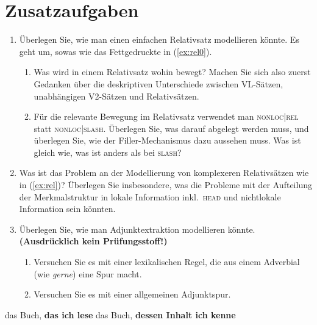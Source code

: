 \documentclass[10pt,a3paper]{article}
\newcommand{\Sub}[1]{\ensuremath{_{\text{#1}}}}
\newcommand{\Zeile}{\vspace{\baselineskip}}
\newcommand{\Halbzeile}{\vspace{0.5\baselineskip}}
\begin{document}

\newpage

\section{Zusatzaufgaben}

\begin{enumerate}
  \item Überlegen Sie, wie man einen einfachen Relativsatz modellieren könnte.
    Es geht um, sowas wie das Fettgedruckte in (\ref{ex:rel0}).
    \begin{enumerate}
      \item Was wird in einem Relativsatz wohin bewegt?
        Machen Sie sich also zuerst Gedanken über die deskriptiven Unterschiede zwischen VL-Sätzen, unabhängigen V2-Sätzen und Relativsätzen.
      \item Für die relevante Bewegung im Relativsatz verwendet man \textsc{nonloc|rel} statt \textsc{nonloc|slash}.
        Überlegen Sie, was darauf abgelegt werden muss, und überlegen Sie, wie der Filler-Mechanismus dazu aussehen muss.
        Was ist gleich wie, was ist anders als bei \textsc{slash}?
    \end{enumerate}
    \Halbzeile
  \item Was ist das Problem an der Modellierung von komplexeren Relativsätzen wie in (\ref{ex:rel})?
    Überlegen Sie insbesondere, was die Probleme mit der Aufteilung der Merkmalstruktur in lokale Information inkl.\ \textsc{head} und nichtlokale Information sein könnten.
    \Halbzeile
  \item Überlegen Sie, wie man Adjunktextraktion modellieren könnte. \textbf{(Ausdrücklich kein Prüfungsstoff!)}
    \begin{enumerate}
      \item Versuchen Sie es mit einer lexikalischen Regel, die aus einem Adverbial (wie \textit{gerne}) eine Spur macht.
      \item Versuchen Sie es mit einer allgemeinen Adjunktspur.
    \end{enumerate}
\end{enumerate}

\Zeile

\begin{exe}
  \ex\label{ex:rel0} das Buch, \textbf{das ich lese}
  \ex\label{ex:rel} das Buch, \textbf{dessen Inhalt ich kenne}
\end{exe}
\end{document}
